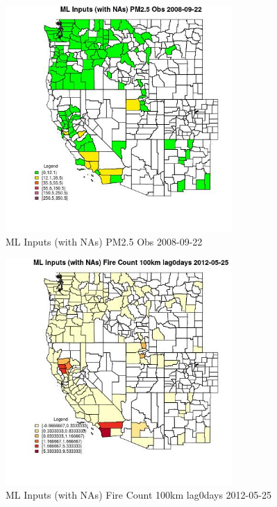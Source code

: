 \begin{figure} 
\centering  
\includegraphics[width=0.77\textwidth]{Code_Outputs/Report_ML_input_PM25_Step4_part_e_de_duplicated_aves_compiled_2019-05-18wNAs_CountyPM25_ObsMean2008-09-22.jpg} 
\caption{\label{fig:Report_ML_input_PM25_Step4_part_e_de_duplicated_aves_compiled_2019-05-18wNAsCountyPM25_ObsMean2008-09-22}ML Inputs (with NAs) PM2.5 Obs 2008-09-22} 
\end{figure} 
 

\begin{figure} 
\centering  
\includegraphics[width=0.77\textwidth]{Code_Outputs/Report_ML_input_PM25_Step4_part_e_de_duplicated_aves_compiled_2019-05-18wNAs_CountyFire_Count_100km_lag0daysMean2012-05-25.jpg} 
\caption{\label{fig:Report_ML_input_PM25_Step4_part_e_de_duplicated_aves_compiled_2019-05-18wNAsCountyFire_Count_100km_lag0daysMean2012-05-25}ML Inputs (with NAs) Fire Count 100km lag0days 2012-05-25} 
\end{figure} 
 

